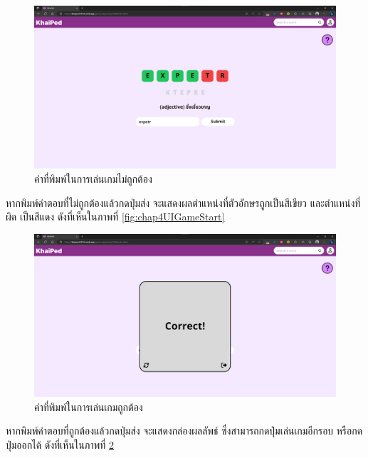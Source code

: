 \documentclass[12pt,oneside,openright,a4paper]{cpe-thai-project}
\begin{document}
\pagebreak
\begin{figure}[!h]\centering
	\includegraphics[width=\textwidth, keepaspectratio=true]{image/chap4/UI/game/wrong.png}
	\caption{{คำที่พิมพ์ในการเล่นเกมไม่ถูกต้อง}}\label{fig:chap4UIGameWrong}
\end{figure}
\hspace{1cm}
หากพิมพ์คำตอบที่ไม่ถูกต้องแล้วกดปุ่มส่ง จะแสดงผลตำแหน่งที่ตัวอักษรถูกเป็นสีเขียว และตำแหน่งที่ผิด
เป็นสีแดง ดังที่เห็นในภาพที่ \ref{fig:chap4UIGameStart}

\begin{figure}[!h]\centering
	\includegraphics[width=\textwidth, keepaspectratio=true]{image/chap4/UI/game/correct.png}
	\caption{{คำที่พิมพ์ในการเล่นเกมถูกต้อง}}\label{fig:chap4UIGameCorrect}
\end{figure}
\hspace{1cm}
หากพิมพ์คำตอบที่ถูกต้องแล้วกดปุ่มส่ง จะแสดงกล่องผลลัพธ์ ซึ่งสามารถกดปุ่มเล่นเกมอีกรอบ หรือกดปุ่มออกได้
ดังที่เห็นในภาพที่ \ref{fig:chap4UIGameCorrect}
\end{document}
